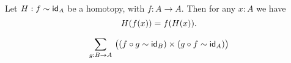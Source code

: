 \documentclass[hott-all.tex]{subfiles}
\begin{document}
\begin{cor}\label{cor:hom-fg}
  Let $H : f \htpy \idfunc[A]$ be a homotopy, with $f : A \to A$. Then for any $x : A$ we have \[ H(f(x)) = \ap f{H(x)}. \]
\end{cor}
%
%


%


\begin{equation}
  \sm{g:B\to A} \big((f \circ g \htpy \idfunc[B]) \times (g\circ f \htpy \idfunc[A])\big)\label{eq:qinvtype}
\end{equation}
\end{document}
